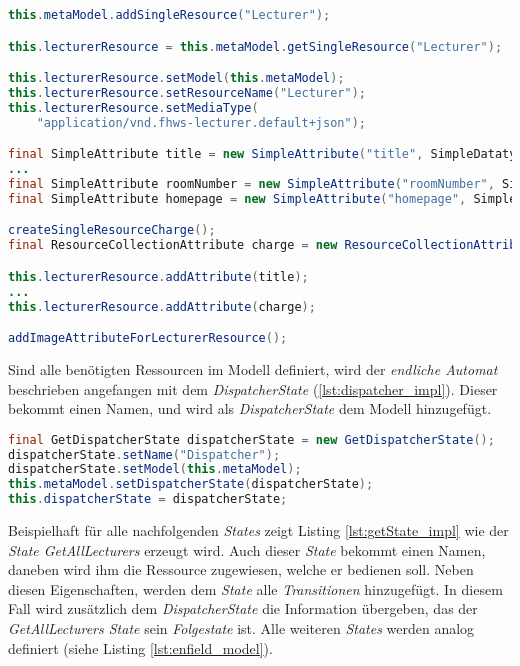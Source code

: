 \begin{lstlisting}[label=lst:lecturer_res,
language=java,
firstnumber=1,
caption=Erzeugung der \textit{SingleResource} \textit{Lecturer}. ]
this.metaModel.addSingleResource("Lecturer");

this.lecturerResource = this.metaModel.getSingleResource("Lecturer");

this.lecturerResource.setModel(this.metaModel);
this.lecturerResource.setResourceName("Lecturer");
this.lecturerResource.setMediaType(
	"application/vnd.fhws-lecturer.default+json");

final SimpleAttribute title = new SimpleAttribute("title", SimpleDatatype.STRING);
...
final SimpleAttribute roomNumber = new SimpleAttribute("roomNumber", SimpleDatatype.STRING);
final SimpleAttribute homepage = new SimpleAttribute("homepage", SimpleDatatype.LINK);

createSingleResourceCharge();
final ResourceCollectionAttribute charge = new ResourceCollectionAttribute("chargeUrl", this.chargeResource);

this.lecturerResource.addAttribute(title);
...
this.lecturerResource.addAttribute(charge);

addImageAttributeForLecturerResource();
\end{lstlisting}

Sind alle benötigten Ressourcen im Modell definiert, wird der \textit{endliche Automat} beschrieben angefangen mit dem \textit{DispatcherState} (\ref{lst:dispatcher_impl}). Dieser bekommt einen Namen, und wird als \textit{DispatcherState} dem Modell hinzugefügt.

\begin{lstlisting}[label=lst:dispatcher_impl,
language=java,
firstnumber=1,
caption=Erzeugung des \textit{DispatcherStates}. ]
final GetDispatcherState dispatcherState = new GetDispatcherState();
dispatcherState.setName("Dispatcher");
dispatcherState.setModel(this.metaModel);
this.metaModel.setDispatcherState(dispatcherState);
this.dispatcherState = dispatcherState;
\end{lstlisting}

\newpage

Beispielhaft für alle nachfolgenden \textit{States} zeigt Listing \ref{lst:getState_impl} wie der \textit{State GetAllLecturers} erzeugt wird.
Auch dieser \textit{State} bekommt einen Namen, daneben wird ihm die Ressource zugewiesen, welche er bedienen soll. Neben diesen Eigenschaften, werden dem \textit{State} alle \textit{Transitionen} hinzugefügt. In diesem Fall wird zusätzlich dem \textit{DispatcherState} die Information übergeben, das der \textit{GetAllLecturers State} sein \textit{Folgestate} ist. Alle weiteren \textit{States} werden analog definiert (siehe Listing \ref{lst:enfield_model}).

